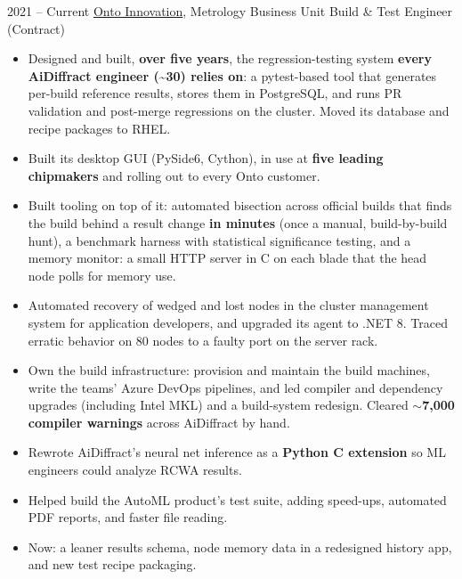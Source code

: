 \documentclass[9pt]{developercv} %
\begin{document}


\begin{entrylist}
    \entry
        {2021 -- Current}
        {\href{https://ontoinnovation.com/}{Onto Innovation}, Metrology Business Unit}
        {Build \& Test Engineer (Contract)}
        {
            \slashsep
            \slashsep
            \slashsep
            \slashsep
            \slashsep
            \slashsep
            \slashsep
            \slashsep
            \begin{itemize}[leftmargin=*, noitemsep, topsep=2pt]
            \item Designed and built, \textbf{over five years}, the regression-testing system \textbf{every AiDiffract engineer (\textasciitilde 30) relies on}: a pytest-based tool that generates per-build reference results, stores them in PostgreSQL, and runs PR validation and post-merge regressions on the cluster. Moved its database and recipe packages to RHEL.
            \item Built its desktop GUI (PySide6, Cython), in use at \textbf{five leading chipmakers} and rolling out to every Onto customer.
            \item Built tooling on top of it: automated bisection across official builds that finds the build behind a result change \textbf{in minutes} (once a manual, build-by-build hunt), a benchmark harness with statistical significance testing, and a memory monitor: a small HTTP server in C on each blade that the head node polls for memory use.
            \item Automated recovery of wedged and lost nodes in the cluster management system for application developers, and upgraded its agent to .NET 8. Traced erratic behavior on 80 nodes to a faulty port on the server rack.
            \item Own the build infrastructure: provision and maintain the build machines, write the teams' Azure DevOps pipelines, and led compiler and dependency upgrades (including Intel MKL) and a build-system redesign. Cleared \textbf{$\sim$7,000 compiler warnings} across AiDiffract by hand.
            \item Rewrote AiDiffract's neural net inference as a \textbf{Python C extension} so ML engineers could analyze RCWA results.
            \item Helped build the AutoML product's test suite, adding speed-ups, automated PDF reports, and faster file reading.
            \item Now: a leaner results schema, node memory data in a redesigned history app, and new test recipe packaging.
            \end{itemize}
        }
\end{entrylist}
\end{document}
